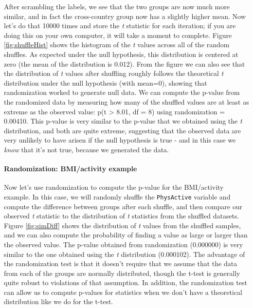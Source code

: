 \documentclass[12pt,]{book}
\let\oldparagraph\paragraph
\renewcommand{\paragraph}[1]{\oldparagraph{#1}\mbox{}}
\theoremstyle{definition}
\theoremstyle{definition}
\theoremstyle{definition}
\theoremstyle{remark}
\begin{document}
After scrambling the labels, we see that the two groups are now much more similar, and in fact the cross-country group now has a slightly higher mean. Now let's do that 10000 times and store the \emph{t} statistic for each iteration; if you are doing this on your own computer, it will take a moment to complete. Figure \ref{fig:shuffleHist} shows the histogram of the \emph{t} values across all of the random shuffles. As expected under the null hypothesis, this distribution is centered at zero (the mean of the distribution is 0.012). From the figure we can also see that the distribution of \emph{t} values after shuffling roughly follows the theoretical \emph{t} distribution under the null hypothesis (with mean=0), showing that randomization worked to generate null data. We can compute the p-value from the randomized data by measuring how many of the shuffled values are at least as extreme as the observed value: p(t \textgreater{} 8.01, df = 8) using randomization = 0.00410. This p-value is very similar to the p-value that we obtained using the \emph{t} distribution, and both are quite extreme, suggesting that the observed data are very unlikely to have arisen if the null hypothesis is true - and in this case we \emph{know} that it's not true, because we generated the data.

\hypertarget{randomization-bmiactivity-example}{%
\paragraph{Randomization: BMI/activity example}\label{randomization-bmiactivity-example}}

Now let's use randomization to compute the p-value for the BMI/activity example. In this case, we will randomly shuffle the \texttt{PhysActive} variable and compute the difference between groups after each shuffle, and then compare our observed \emph{t} statistic to the distribution of \emph{t} statistics from the shuffled datasets. Figure \ref{fig:simDiff} shows the distribution of \emph{t} values from the shuffled samples, and we can also compute the probability of finding a value as large or larger than the observed value. The p-value obtained from randomization (0.000000) is very similar to the one obtained using the \emph{t} distribution (0.000102). The advantage of the randomization test is that it doesn't require that we assume that the data from each of the groups are normally distributed, though the t-test is generally quite robust to violations of that assumption. In addition, the randomization test can allow us to compute p-values for statistics when we don't have a theoretical distribution like we do for the t-test.
\end{document}
